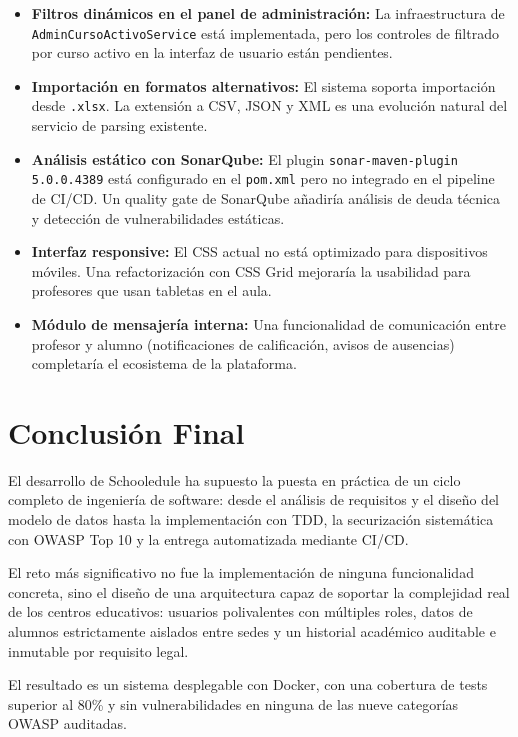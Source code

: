 \documentclass[12pt, a4paper]{report}
\begin{document}
\begin{itemize}
  \item \textbf{Filtros dinámicos en el panel de administración:} La infraestructura
        de \texttt{AdminCursoActivoService} está implementada, pero los controles
        de filtrado por curso activo en la interfaz de usuario están pendientes.
  \item \textbf{Importación en formatos alternativos:} El sistema soporta
        importación desde \texttt{.xlsx}. La extensión a CSV, JSON y XML es una
        evolución natural del servicio de parsing existente.
  \item \textbf{Análisis estático con SonarQube:} El plugin
        \texttt{sonar-maven-plugin 5.0.0.4389} está configurado en el
        \texttt{pom.xml} pero no integrado en el pipeline de CI/CD. Un quality gate
        de SonarQube añadiría análisis de deuda técnica y detección de
        vulnerabilidades estáticas.
  \item \textbf{Interfaz responsive:} El CSS actual no está optimizado para
        dispositivos móviles. Una refactorización con CSS Grid mejoraría la
        usabilidad para profesores que usan tabletas en el aula.
  \item \textbf{Módulo de mensajería interna:} Una funcionalidad de comunicación
        entre profesor y alumno (notificaciones de calificación, avisos de
        ausencias) completaría el ecosistema de la plataforma.
\end{itemize}

\section{Conclusión Final}

El desarrollo de Schooledule ha supuesto la puesta en práctica de un ciclo completo
de ingeniería de software: desde el análisis de requisitos y el diseño del modelo
de datos hasta la implementación con TDD, la securización sistemática con OWASP
Top 10 y la entrega automatizada mediante CI/CD.

El reto más significativo no fue la implementación de ninguna funcionalidad
concreta, sino el diseño de una arquitectura capaz de soportar la complejidad real
de los centros educativos: usuarios polivalentes con múltiples roles, datos de
alumnos estrictamente aislados entre sedes y un historial académico auditable e
inmutable por requisito legal.

El resultado es un sistema desplegable con Docker, con una cobertura de tests
superior al 80\% y sin vulnerabilidades en ninguna de las nueve categorías OWASP
auditadas.
\end{document}
